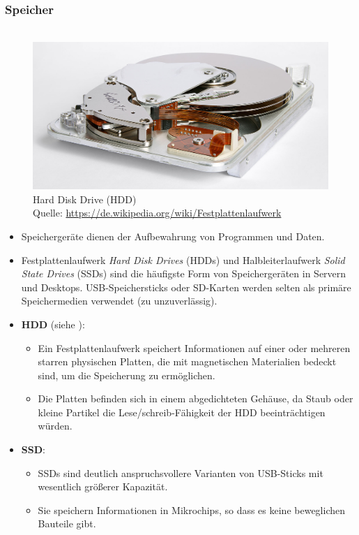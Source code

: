 ~\\
	\subsubsection{Speicher}
	\begin{figure}[h!]
		\centering
		~\\
		\includegraphics[width=0.5\linewidth]{./media/hdd} \\
		\tiny
		Hard Disk Drive (HDD)\\
		Quelle: \url{https://de.wikipedia.org/wiki/Festplattenlaufwerk}
	\end{figure}
	\begin{itemize}
		\item Speichergeräte dienen der Aufbewahrung von Programmen und Daten.
		\item Festplattenlaufwerk \textit{Hard Disk Drives} (HDDs) und Halbleiterlaufwerk \textit{Solid State Drives} (SSDs) sind die häufigste Form von Speichergeräten in Servern und Desktops. USB-Speichersticks oder SD-Karten werden selten als primäre Speichermedien verwendet (zu unzuverlässig).
		\item \textbf{HDD} (siehe ):
		\begin{itemize}
			\item  Ein Festplattenlaufwerk speichert Informationen auf einer oder mehreren starren physischen Platten, die mit magnetischen Materialien bedeckt sind, um die Speicherung zu ermöglichen.
			\item Die Platten befinden sich in einem abgedichteten Gehäuse, da Staub oder kleine Partikel die Lese/schreib-Fähigkeit der HDD beeinträchtigen würden.
		\end{itemize}
		\item \textbf{SSD}:\begin{itemize}
			\item  SSDs sind deutlich anspruchsvollere Varianten von USB-Sticks mit wesentlich größerer Kapazität. 
			\item Sie speichern Informationen in Mikrochips, so dass es keine beweglichen Bauteile gibt.
		\end{itemize}
	\end{itemize}
